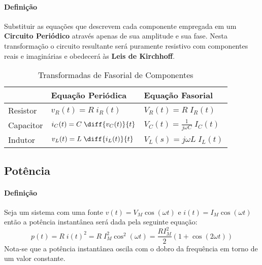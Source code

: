 \documentclass{article}
\begin{document}
        \paragraph{Definição}Substituir as equações que descrevem cada componente empregada em um \textbf{Circuito Periódico} através apenas de sua amplitude e sua fase. Nesta transformação o circuito resultante será puramente resistivo com componentes reais e imaginárias e obedecerá às \textbf{Leis de Kirchhoff}.
            \begin{table}[H]
                \centering
                \begingroup
                \renewcommand{\arraystretch}{1.25}
                \begin{tabular}[]{lll}
                                & Equação Periódica                  & Equação Fasorial\\\hline
                    Resistor  & $v_{R}(t) = R\;i_{R}(t)$           & $V_{R}(t) = R\;I_{R}(t)$\\[2.5mm]
                    Capacitor & $i_{C}(t) = C\;\diff{v_{C}(t)}{t}$ & $V_{C}(t) = \frac{1}{j\omega C}\;I_{C}(t)$\\[2.5mm]
                    Indutor   & $v_{L}(t) = L\;\diff{i_{L}(t)}{t}$ & $V_{L}(s) = j\omega L\;I_{L}(t)$\\[2.5mm]\hline
                \end{tabular}
                \endgroup
                \caption{Transformadas de Fasorial de Componentes}\label{table:FasorialComponents}
            \end{table} \noindent

    \subsection{Potência}
        \paragraph{Definição}Seja um sistema com uma fonte $v(t) = V_{M}\cos(\omega t)$ e $i(t) = I_{M}\cos(\omega t)$ então a potência instantânea será dada pela seguinte equação:
            \begin{equation}
                p(t) = 
                R\;i(t)^{2} = 
                R\;I_{M}^{2}\cos^{2}(\omega t) = 
                \boxed{
                    \frac{R I_{M}^{2}}{2}(1 + \cos(2\omega t))
                }
            \end{equation}
        Nota-se que a potência instantânea oscila com o dobro da frequência em torno de um valor constante.
\end{document}
